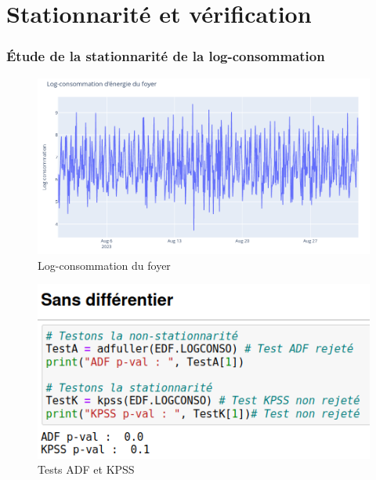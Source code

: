 \documentclass{beamer}
\theoremstyle{definition}
\begin{document}
\section{Stationnarité et vérification}
\begin{frame}
	\frametitle{Étude de la stationnarité de la log-consommation}
	\begin{minipage}[t]{1\linewidth}
	\begin{minipage}[c]{0.58\linewidth}\centering\begin{figure}
			\centering
			\includegraphics[width=1\linewidth]{5.png}
			\caption*{Log-consommation du foyer}
	\end{figure}\end{minipage}\hfill 
	\begin{minipage}[c]{0.4\linewidth}\centering\begin{figure}
			\begin{center}
				\includegraphics[width=1\linewidth]{6.png}			
				\caption*{Tests ADF et KPSS}
			\end{center}
			
	\end{figure}\end{minipage}
\end{minipage}
	
\end{frame}
\end{document}
